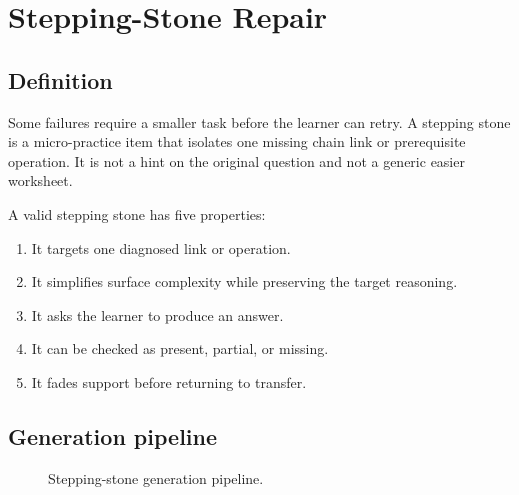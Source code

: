 \documentclass[11pt]{article}
\begin{document}
\section{Stepping-Stone Repair}

\subsection{Definition}

Some failures require a smaller task before the learner can retry. A stepping stone is a micro-practice item that isolates one missing chain link or prerequisite operation. It is not a hint on the original question and not a generic easier worksheet.

A valid stepping stone has five properties:

\begin{enumerate}
\item It targets one diagnosed link or operation.
\item It simplifies surface complexity while preserving the target reasoning.
\item It asks the learner to produce an answer.
\item It can be checked as present, partial, or missing.
\item It fades support before returning to transfer.
\end{enumerate}

\subsection{Generation pipeline}

\begin{figure}[H]
\centering
{}
\caption{Stepping-stone generation pipeline.}
\label{fig:stonespipeline}
\end{figure}
\end{document}
